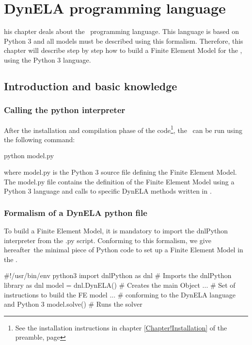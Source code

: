 \chapter{DynELA programming language}

\startcontents[chapters]
\printmyminitoc[1]his chapter deals about the \DynELA~programming language. This language is based on Python 3 and all models must be described using this formalism. Therefore, this chapter will describe step by step how to build a Finite Element Model for the \DynELA, using the Python 3 language.

\section{Introduction and basic knowledge}

\subsection{Calling the python interpreter}

After the installation and compilation phase of the code\footnote{See the installation instructions in chapter \ref{Chapter!Installation} of the preamble, page \pageref{Chapter!Installation}}, the \DynELA~can be run using the following command:

\begin{BashListing}
python model.py
\end{BashListing}

where \textsf{model.py} is the Python 3 source file defining the Finite Element Model. The \textsf{model.py} file contains the definition of the Finite Element Model using a Python 3 language and calls to specific DynELA methods written in \Cpp.

\subsection{Formalism of a DynELA python file}

To build a Finite Element Model, it is mandatory to import the \textsf{dnlPython} interpreter from the \textsf{.py} script. Conforming to this formalism, we give hereafter the minimal piece of Python code to set up a Finite Element Model in the \DynELA.

\begin{PythonListing}
#!/usr/bin/env python3
import dnlPython as dnl # Imports the dnlPython library as dnl
model = dnl.DynELA()    # Creates the main Object
...                     # Set of instructions to build the FE model
...                     # conforming to the DynELA language and Python 3
model.solve()           # Runs the solver
\end{PythonListing}

